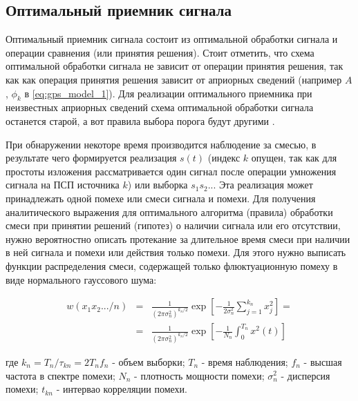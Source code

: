 \subsection{Оптимальный приемник сигнала}

Оптимальный приемник сигнала состоит из оптимальной обработки сигнала и операции сравнения (или принятия решения). Стоит отметить,
что схема оптимальной обработки сигнала не зависит от операции принятия решения, так как как операция принятия решения зависит от
априорных сведений (например $A$, $\phi_k$ в \ref{eq:gps_model_1}). Для реализации оптимального приемника при неизвестных априорных
сведений схема оптимальной обработки сигнала останется старой, а вот правила выбора порога будут другими \cite{pestryakov-book}.

При обнаружении некоторе время производится наблюдение за смесью, в результате чего формируется реализация $s(t)$ (индекс $k$
опущен, так как для простоты изложения рассматривается один сигнал после операции умножения сигнала на ПСП источника $k$) или
выборка $s_{1}s_{2}...$ Эта реализация может принадлежать одной помехе или смеси сигнала и помехи. Для получения аналитического
выражения для оптимального алгоритма (правила) обработки смеси при принятии решений (гипотез) о наличии сигнала или его отсутствии,
нужно вероятностно описать протекание за длительное время смеси при наличии в ней сигнала и помехи или действия только помехи. Для
этого нужно выписать функции распределения смеси, содержащей только флюктуационную помеху в виде нормального гауссового шума:
\begin{center}
\begin{eqnarray}
	\label{eq:just_noise}
	w(x_{1}x_{2}.../n) & = & \frac{1}{(2\pi\sigma_{n}^{2})^{k_n/2}}\exp[-\frac{1}{2\sigma_{n}^{2}}\sum_{j=1}^{k_n}x_{j}^2] = \\
			& = & \frac{1}{(2\pi\sigma_{n}^{2})^{k_n/2}}\exp[-\frac{1}{N_n}\int_{0}^{T_n}x^2(t)] \nonumber
\end{eqnarray}
\end{center}
где $k_n=T_n/\tau_{kn}=2T_nf_{n}$ - объем выборки; ${T_n}$ - время наблюдения; ${f_{n}}$ - высшая частота в спектре помехи;
${N_n}$ - плотность мощности помехи; ${\sigma_{n}^{2}}$ - дисперсия помехи; ${t_{kn}}$ - интервао корреляции помехи.

